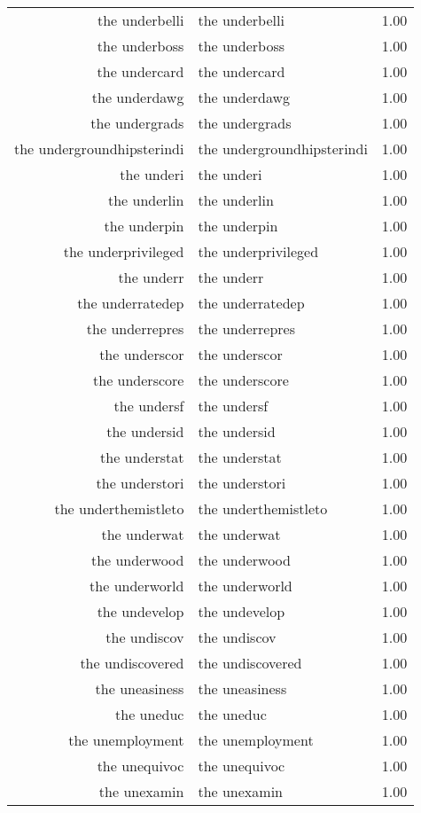 \begin{table}[ht]
\begin{tabular}{rlr}
  the underbelli & the underbelli & 1.00 \\ 
  the underboss & the underboss & 1.00 \\ 
  the undercard & the undercard & 1.00 \\ 
  the underdawg & the underdawg & 1.00 \\ 
  the undergrads & the undergrads & 1.00 \\ 
  the undergroundhipsterindi & the undergroundhipsterindi & 1.00 \\ 
  the underi & the underi & 1.00 \\ 
  the underlin & the underlin & 1.00 \\ 
  the underpin & the underpin & 1.00 \\ 
  the underprivileged & the underprivileged & 1.00 \\ 
  the underr & the underr & 1.00 \\ 
  the underratedep & the underratedep & 1.00 \\ 
  the underrepres & the underrepres & 1.00 \\ 
  the underscor & the underscor & 1.00 \\ 
  the underscore & the underscore & 1.00 \\ 
  the undersf & the undersf & 1.00 \\ 
  the undersid & the undersid & 1.00 \\ 
  the understat & the understat & 1.00 \\ 
  the understori & the understori & 1.00 \\ 
  the underthemistleto & the underthemistleto & 1.00 \\ 
  the underwat & the underwat & 1.00 \\ 
  the underwood & the underwood & 1.00 \\ 
  the underworld & the underworld & 1.00 \\ 
  the undevelop & the undevelop & 1.00 \\ 
  the undiscov & the undiscov & 1.00 \\ 
  the undiscovered & the undiscovered & 1.00 \\ 
  the uneasiness & the uneasiness & 1.00 \\ 
  the uneduc & the uneduc & 1.00 \\ 
  the unemployment & the unemployment & 1.00 \\ 
  the unequivoc & the unequivoc & 1.00 \\ 
  the unexamin & the unexamin & 1.00 \\ 

\end{tabular}
\end{table}
